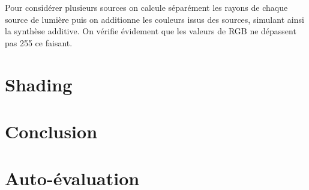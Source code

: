 \documentclass[11pt,a4paper]{article}
\begin{document}
Pour considérer plusieurs sources on calcule séparément les rayons de chaque source de lumière puis on additionne les couleurs issus des sources, simulant ainsi la synthèse additive. On vérifie évidement que les valeurs de RGB ne dépassent pas 255 ce faisant.

\section{Shading}

\section*{Conclusion}

\section*{Auto-évaluation}
\end{document}
